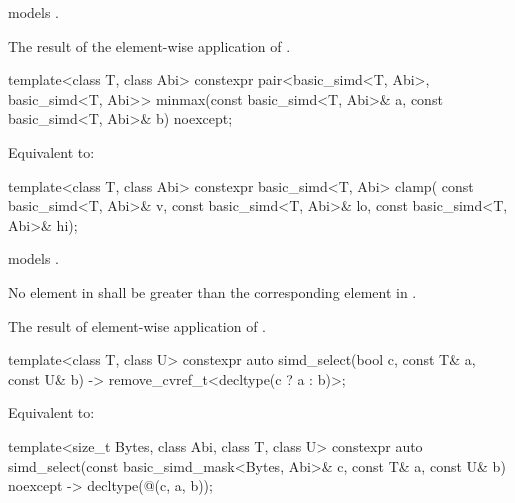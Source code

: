 \begin{itemdescr}
  \pnum\constraints
   models .

  \pnum\returns
  The result of the element-wise application of  .
\end{itemdescr}

\begin{itemdecl}
template<class T, class Abi>
  constexpr pair<basic_simd<T, Abi>, basic_simd<T, Abi>>
  minmax(const basic_simd<T, Abi>& a, const basic_simd<T, Abi>& b) noexcept;
\end{itemdecl}

\begin{itemdescr}
  \pnum\effects
  Equivalent to: 
\end{itemdescr}

\begin{itemdecl}
template<class T, class Abi>
  constexpr basic_simd<T, Abi> clamp(
    const basic_simd<T, Abi>& v, const basic_simd<T, Abi>& lo, const basic_simd<T, Abi>& hi);
\end{itemdecl}

\begin{itemdescr}
  \pnum\constraints
   models .

  \pnum\expects
  No element in  shall be greater than the corresponding element in .

  \pnum\returns
  The result of element-wise application of 
  .
\end{itemdescr}

\begin{itemdecl}
  template<class T, class U>
    constexpr auto simd_select(bool c, const T& a, const U& b)
    -> remove_cvref_t<decltype(c ? a : b)>;
\end{itemdecl}

\begin{itemdescr}
    \pnum\effects
    Equivalent to: 
\end{itemdescr}

\begin{itemdecl}
  template<size_t Bytes, class Abi, class T, class U>
    constexpr auto simd_select(const basic_simd_mask<Bytes, Abi>& c, const T& a, const U& b)
    noexcept -> decltype(@\simdselect@(c, a, b));
\end{itemdecl}

